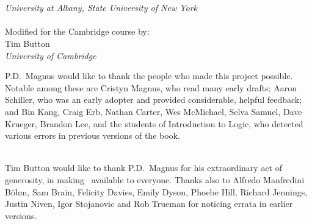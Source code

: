\thispagestyle{empty}
\noindent {\HUGE\forallx}

\


\vfill


\\
\emph{University at Albany, State University of New York}\\
\\
{Modified for the Cambridge course by:\\ Tim Button}\\
\emph{University of Cambridge}



\newpage
\thispagestyle{empty}%
\noindent P.D.\ Magnus would like to thank the people who made this project possible. Notable among these are Cristyn Magnus, who read many early drafts; Aaron Schiller, who was an early adopter and provided considerable, helpful feedback; {and} Bin Kang, Craig Erb, Nathan Carter, Wes McMichael, Selva Samuel,  Dave Krueger, Brandon Lee, and the students of Introduction to Logic, who detected various errors in previous versions of the book.

\
\\
Tim Button would like to thank P.D.\ Magnus for his extraordinary act of generosity, in making \forallx\ available to everyone. Thanks also to Alfredo Manfredini B\"{o}hm, Sam Brain, Felicity Davies, Emily Dyson, Phoebe Hill, Richard Jennings, Justin Niven, Igor Stojanovic and Rob Trueman for noticing errata in earlier versions.

